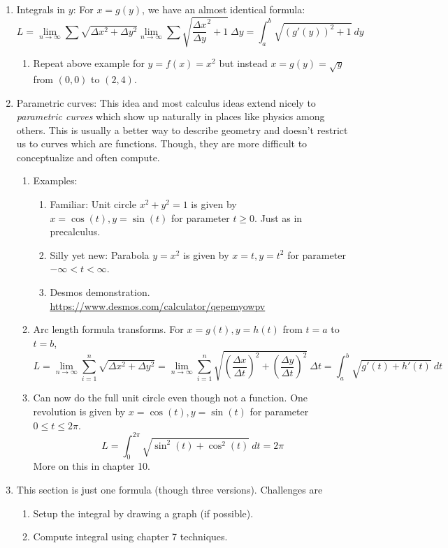 \documentclass{article}
\begin{document}
\begin{enumerate}
\item Integrals in $y$: For $x=g(y)$, we have an almost identical formula:
\[
L = \lim_{n\rightarrow \infty} \sum \sqrt{\Delta x^2 + \Delta y^2}
\lim_{n\rightarrow \infty} \sum \sqrt{\frac{\Delta x}{\Delta y}^2 + 1} ~\Delta y = \int_a^b \sqrt{(g'(y))^2+1 } ~dy
\]
\begin{enumerate}
\item Repeat above example for $y=f(x)=x^2$ but instead $x=g(y)=\sqrt{y}$ from $(0,0)$ to $(2,4)$. 
\end{enumerate}

\item Parametric curves: This idea and most calculus ideas extend nicely to \emph{parametric curves} which show up naturally in places like physics among others. This is usually a better way to describe geometry and doesn't restrict us to curves which are functions. Though, they are more difficult to conceptualize and often compute.
\begin{enumerate}

\item Examples:
\begin{enumerate}
\item Familiar: Unit circle $x^2+y^2=1$ is given by $x=\cos(t), y=\sin(t)$ for parameter $t \geq 0$. Just as in precalculus.
\item Silly yet new: Parabola $y=x^2$ is given by $x=t, y=t^2$ for parameter $-\infty <t< \infty$.
\item Desmos demonstration. \\
\url{https://www.desmos.com/calculator/qepemyowpv}
\end{enumerate}

\item Arc length formula transforms. For $x=g(t), y=h(t)$ from $t=a$ to $t=b$,
\[
L
= \lim_{n\rightarrow \infty} \sum_{i=1}^n \sqrt{\Delta x^2 + \Delta y^2}
= \lim_{n\rightarrow \infty} \sum_{i=1}^n \sqrt{\left(\frac{\Delta x}{\Delta t}\right)^2 + \left(\frac{\Delta y}{\Delta t}\right)^2} ~\Delta t
= \int_a^b \sqrt{g'(t)+h'(t)}~dt
\]

\item Can now do the full unit circle even though not a function. One revolution is given by $x=\cos(t), y=\sin(t)$ for parameter $0\leq t \leq 2\pi$.
\[
L = \int_0^{2\pi} \sqrt{\sin^2(t)+\cos^2(t)}~dt = 2\pi
\]
More on this in chapter 10.
\end{enumerate}

\item This section is just one formula (though three versions). Challenges are
\begin{enumerate}
\item Setup the integral by drawing a graph (if possible).
\item Compute integral using chapter 7 techniques.
\end{enumerate}
\end{enumerate}
\end{document}
